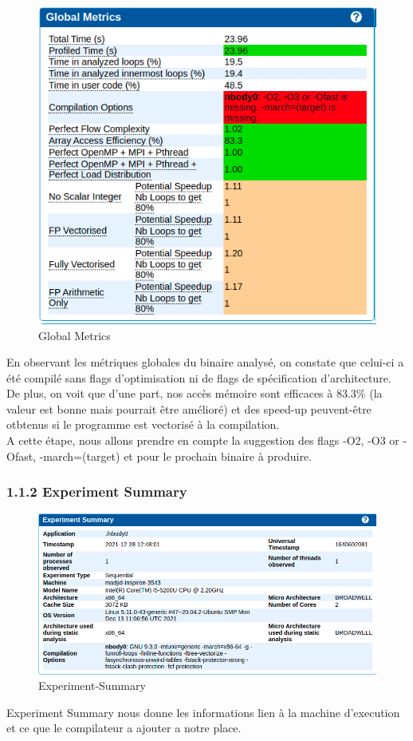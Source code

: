 \documentclass[11pt,a4paper,onecolumn,openright,oneside]{report}
\begin{document}
\begin{figure}[H]
    \centering
    \includegraphics[scale=0.45]{Images/1/Global-Metric.png}
    \caption{Global Metrics}
    \label{fig:my_label}
\end{figure}

En observant les métriques globales du binaire analysé, on constate que celui-ci a été compilé sans flags d'optimisation ni de flags de spécification
d'architecture. De plus, on voit que d'une part, nos accès mémoire sont efficaces à 83.3\% (la valeur est bonne mais pourrait être amélioré) et des speed-up
peuvent-être otbtenus si le programme est vectorisé à la compilation.\\

A cette étape, nous allons prendre en compte la suggestion des flags -O2, -O3 or -Ofast, -march=(target) et pour le prochain binaire à produire.

\subsubsection{1.1.2 Experiment Summary}
\begin{figure}[H]
    \centering
    \includegraphics[scale=0.4]{Images/1/Experiment-Summary.png}
    \caption{Experiment-Summary}
    \label{fig:my_label}
\end{figure}
Experiment Summary nous donne les informations lien à la machine d'execution et ce que le compilateur a ajouter a notre place.
\end{document}
